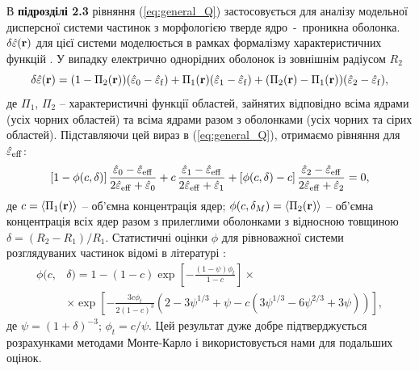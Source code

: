 \documentclass[twoside,a4paper,14pt]{vakaref-utf8}
\begin{document}
В {\bf підрозділі 2.3} рівняння (\ref{eq:general_Q}) застосовується для аналізу модельної дисперсної системи частинок з морфологією тверде ядро~-~проникна оболонка. $\delta\hat{\varepsilon}({\bf r})$ для цієї системи моделюється в рамках формалізму характеристичних функцій \cite{Torquato}. У випадку електрично однорідних оболонок із зовнішнім радіусом $R_2$
\begin{equation}\label{eq:delta-eps-1layer}
\delta\hat{\varepsilon} ({\bf r}) = (1 - \Pi_2 ({\bf r})) (\hat{\varepsilon}_0 - \hat{\varepsilon}_{\rm f})
+ \Pi_1 ({\bf r}) (\hat{\varepsilon}_1 - \hat{\varepsilon}_{\rm f})
+ (\Pi_2 ({\bf r}) - \Pi_1 ({\bf r})) (\hat{\varepsilon}_2 - \hat{\varepsilon}_{\rm f}),
\end{equation}
де $\Pi_1$, $\Pi_2$ -- характеристичні функції областей, зайнятих відповідно всіма ядрами (усіх чорних областей) та всіма ядрами разом з оболонками (усіх чорних та сірих областей). Підставляючи цей вираз в (\ref{eq:general_Q}), отримаємо рівняння для $\hat{\varepsilon}_{\rm eff}$:
\begin{equation}\label{eq:general_uniformshell}
	\left[1-\phi(c, \delta)\right]\frac{\hat{\varepsilon}_0
		-\hat{\varepsilon}_{\rm eff}}{2\hat{\varepsilon}_{\rm
			eff}+\hat{\varepsilon}_0} + c\,\frac{\hat{\varepsilon}_1
		-\hat{\varepsilon}_{\rm eff}}{2\hat{\varepsilon}_{\rm
			eff}+\hat{\varepsilon}_1}
	+\left[\phi(c, \delta)-c\right]\frac{\hat{\varepsilon}_2
		-\hat{\varepsilon}_{\rm eff}}{2\hat{\varepsilon}_{\rm
			eff}+\hat{\varepsilon}_2}=0,
\end{equation}
де $c = \langle \Pi_1 ({\bf r}) \rangle$ -- об'ємна концентрація ядер; $\phi(c,\delta_M) = \langle \Pi_2 ({\bf r}) \rangle$ -- об'ємна концентрація всіх ядер разом з прилеглими оболонками з відносною товщиною $\delta = (R_2 - R_1)/R_1$. Статистичні оцінки $\phi$ для рівноважної системи розглядуваних частинок відомі в літературі \cite{RikvoldP.1985}:
\begin{equation}\label{eq:phi_pen}
\begin{split}
\phi(c,&\delta) = 1 - (1-c)\exp{\left[ -\frac{(1-\psi)\phi_t}{1-c} \right]} \times \\
&\times\exp{\left[ -\frac{3c\phi_t}{2(1-c)^3} \left( 2 - 3
	\psi^{1/3} + \psi - c \left( 3\psi^{1/3} - 6\psi^{2/3} +3\psi
	\right) \right) \right]},
\end{split}
\end{equation}
де $\psi = (1+\delta)^{-3}$; $\phi_t = c/\psi$.
Цей результат дуже добре підтверджується розрахунками методами Монте-Карло \cite{Rotter2003} і використовується нами для подальших оцінок. 
\end{document}
